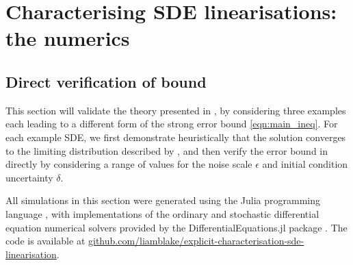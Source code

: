 \chapter{Characterising SDE linearisations: the numerics}

\section{Direct verification of bound}\label{sec:numerics}

This section will validate the theory presented in , by considering three examples each leading to a different form of the strong error bound \eqref{eqn:main_ineq}.
For each example SDE, we first demonstrate heuristically that the solution converges to the limiting distribution described by , and then verify the error bound in  directly by considering a range of values for the noise scale \(\epsilon\) and initial condition uncertainty \(\delta\).




All simulations in this section were generated using the Julia programming language \cite{BezansonEtAl_2017_JuliaFreshApproach}, with implementations of the ordinary and stochastic differential equation numerical solvers provided by the DifferentialEquations.jl package \cite{RackauckasNie_2017_DifferentialEquationsJlPerformant}.
The code is available at \href{https://github.com/liamblake/explicit-characterisation-sde-linearisation}{github.com/liamblake/explicit-characterisation-sde-linearisation}.





